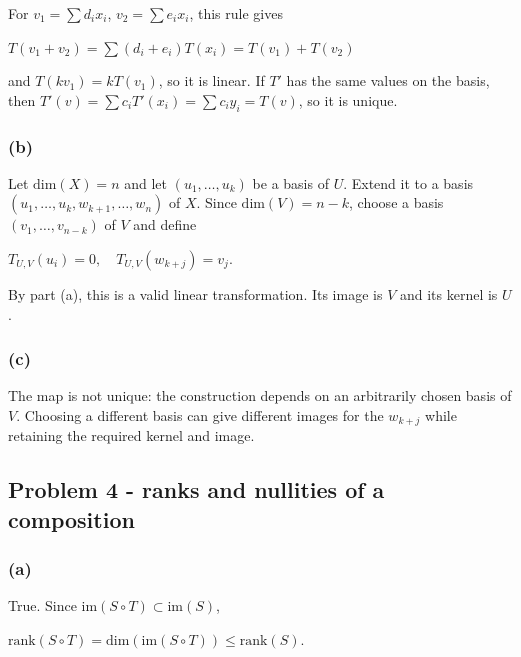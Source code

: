 For \(v_{1} = \sum d_{i}x_{i}\), \(v_{2} = \sum e_{i}x_{i}\), this rule gives

\(T\left( {v_{1} + v_{2}} \right) = \sum\left( {d_{i} + e_{i}} \right)T\left( x_{i} \right) = T\left( v_{1} \right) + T\left( v_{2} \right)\)

and \(T\left( {kv_{1}} \right) = kT\left( v_{1} \right)\), so it is linear. If \(T'\) has the same values on the basis, then \(T'(v) = \sum c_{i}T'\left( x_{i} \right) = \sum c_{i}y_{i} = T(v)\), so it is unique.

\subsubsection{(b)}

Let \(\text{dim}(X) = n\) and let \(\left( {u_{1},\ldots,u_{k}} \right)\) be a basis of \(U\). Extend it to a basis \(\left( {u_{1},\ldots,u_{k},w_{k + 1},\ldots,w_{n}} \right)\) of \(X\). Since \(\text{dim}(V) = n - k\), choose a basis \(\left( {v_{1},\ldots,v_{n - k}} \right)\) of \(V\) and define

\(T_{U,V}\left( u_{i} \right) = 0,\quad T_{U,V}\left( w_{k + j} \right) = v_{j}.\)

By part (a), this is a valid linear transformation. Its image is \(V\) and its kernel is \(U\).

\subsubsection{(c)}

The map is not unique: the construction depends on an arbitrarily chosen basis of \(V\). Choosing a different basis can give different images for the \(w_{k + j}\) while retaining the required kernel and image.

\subsection{Problem 4 - ranks and nullities of a composition}

\subsubsection{(a)}

True. Since \(\text{im}\left( {S \circ T} \right) \subset \text{im}(S)\),

\(\text{rank}\left( {S \circ T} \right) = \text{dim}\left( {\text{im}\left( {S \circ T} \right)} \right) \leq \text{rank}(S).\)

